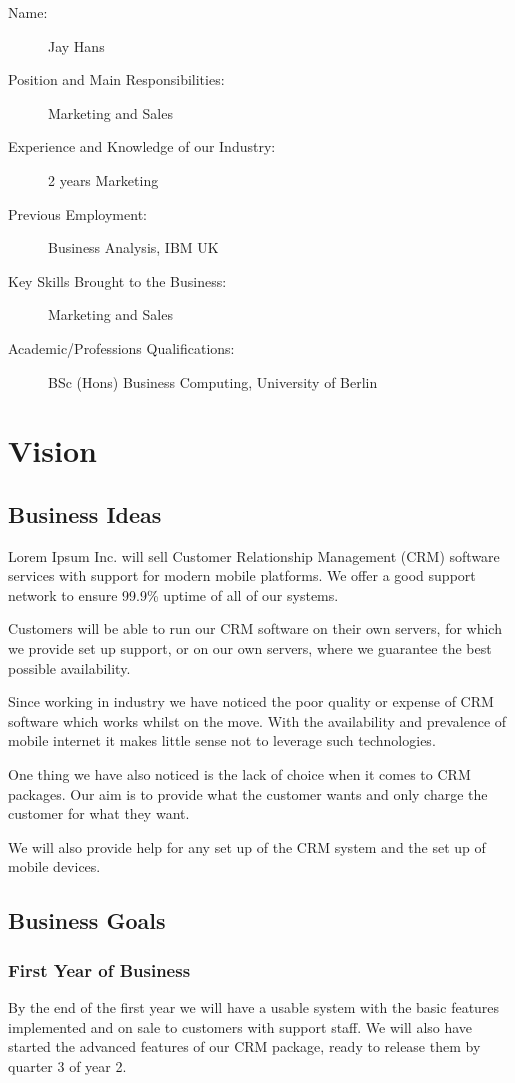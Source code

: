 \documentclass[DIV=calc, paper=a4, fontsize=11pt]{scrartcl}	 %
\begin{document}
\begin{description}
\item[Name:] Jay Hans
\item[Position and Main Responsibilities:] Marketing and Sales
\item[Experience and Knowledge of our Industry:] 2 years Marketing
\item[Previous Employment:] Business Analysis, IBM UK
\item[Key Skills Brought to the Business:] Marketing and Sales
\item[Academic/Professions Qualifications:] BSc (Hons) Business Computing, University of Berlin
\end{description}


\section{Vision}

\subsection{Business Ideas}
Lorem Ipsum Inc. will sell Customer Relationship Management (CRM) software services with support
for modern mobile platforms. We offer a good support network to ensure 99.9\% uptime of all of our
systems.

Customers will be able to run our CRM software on their own servers, for which we provide set up
support, or on our own servers, where we guarantee the best possible availability.

Since working in industry we have noticed the poor quality or expense of CRM software which works
whilst on the move. With the availability and prevalence of mobile internet it makes little sense
not to leverage such technologies.

One thing we have also noticed is the lack of choice when it comes to CRM packages. Our aim is to
provide what the customer wants and only charge the customer for what they want.

We will also provide help for any set up of the CRM system and the set up of mobile devices.

\subsection{Business Goals}
\subsubsection*{First Year of Business}
By the end of the first year we will have a usable system with the basic features implemented and
on sale to customers with support staff. We will also have started the advanced features of our
CRM package, ready to release them by quarter 3 of year 2. 
\end{document}
